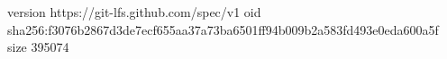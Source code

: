 version https://git-lfs.github.com/spec/v1
oid sha256:f3076b2867d3de7ecf655aa37a73ba6501ff94b009b2a583fd493e0eda600a5f
size 395074
